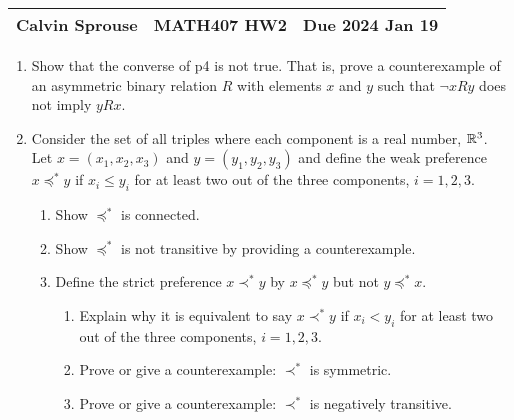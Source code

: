 \documentclass[a4paper, 12pt]{config/homework}
\begin{document}
\noindent
\begin{tabularx}{\textwidth}{>{\centering\arraybackslash}X>{\centering\arraybackslash}X>{\centering\arraybackslash}X}
Calvin Sprouse & MATH407 HW2 & Due 2024 Jan 19\\
\midrule
\end{tabularx}

\begin{enumerate}
\item Show that the converse of p4 is not true. That is, prove a counterexample of an asymmetric binary relation \(R\) with elements \(x\) and \(y\) such that \(\neg xRy\) does not imply \(yRx\).

\item Consider the set of all triples where each component is a real number, \(\mathbb{R}^3\). Let \(x=(x_1,x_2,x_3)\) and \(y=(y_1,y_2,y_3)\) and define the weak preference \(x \preccurlyeq^* y\) if \(x_i \le y_i\) for at least two out of the three components, \(i=1,2,3\).
\begin{enumerate}[label= (\alph*)]
\item Show \(\preccurlyeq^*\) is connected.

\item Show \(\preccurlyeq^*\) is not transitive by providing a counterexample.

\item Define the strict preference \(x \prec^* y\) by \(x \preccurlyeq^* y\) but not \(y \preccurlyeq^* x\).
\begin{enumerate}[label= \roman*.]
\item Explain why it is equivalent to say \(x \prec^* y\) if \(x_i < y_i\) for at least two out of the three components, \(i=1,2,3\).

\item Prove or give a counterexample: \(\prec^*\) is symmetric.

\item Prove or give a counterexample: \(\prec^*\) is negatively transitive.

\end{enumerate}
\end{enumerate}
\end{enumerate}
\end{document}
